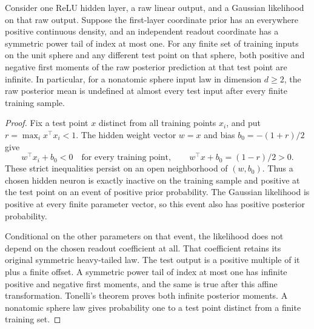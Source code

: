 \documentclass[11pt]{article}
\theoremstyle{remark}\newtheorem{remark}[theorem]{Remark}
\begin{document}
\begin{proposition}
\label{prop:undefined-raw-mean}
Consider one ReLU hidden layer, a raw linear output, and a Gaussian likelihood on that raw output. Suppose the first-layer coordinate prior has an everywhere positive continuous density, and an independent readout coordinate has a symmetric power tail of index at most one. For any finite set of training inputs on the unit sphere and any different test point on that sphere, both positive and negative first moments of the raw posterior prediction at that test point are infinite. In particular, for a nonatomic sphere input law in dimension $d\ge2$, the raw posterior mean is undefined at almost every test input after every finite training sample.
\end{proposition}
\begin{proof}
Fix a test point $x$ distinct from all training points $x_i$, and put
$r=\max_i x^\top x_i<1$. The hidden weight vector $w=x$ and bias
$b_0=-(1+r)/2$ give
\[
 w^\top x_i+b_0<0\quad\text{for every training point},\qquad
 w^\top x+b_0=(1-r)/2>0.
\]
These strict inequalities persist on an open neighborhood of $(w,b_0)$.
Thus a chosen hidden neuron is exactly inactive on the training sample and positive at the test point on an event of positive prior probability. The Gaussian likelihood is positive at every finite parameter vector, so this event also has positive posterior probability.

Conditional on the other parameters on that event, the likelihood does not depend on the chosen readout coefficient at all. That coefficient retains its original symmetric heavy-tailed law. The test output is a positive multiple of it plus a finite offset. A symmetric power tail of index at most one has infinite positive and negative first moments, and the same is true after this affine transformation. Tonelli's theorem proves both infinite posterior moments. A nonatomic sphere law gives probability one to a test point distinct from a finite training set.
\end{proof}
\end{document}
